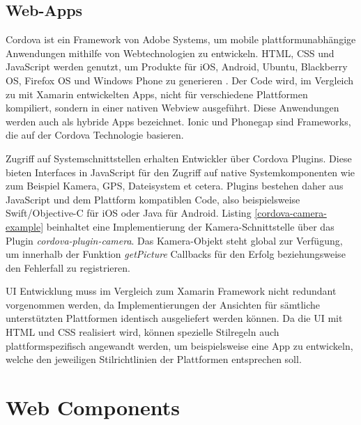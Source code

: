 \newpage


\subsection{Web-Apps}

Cordova ist ein Framework von Adobe Systems, um mobile plattformunabhängige Anwendungen mithilfe von Webtechnologien zu entwickeln.
\ac{HTML}, \ac{CSS} und JavaScript werden genutzt, um Produkte für iOS, Android, Ubuntu, Blackberry OS, Firefox OS und Windows Phone zu generieren \cite{Cordo26:online}.
Der Code wird, im Vergleich zu mit Xamarin entwickelten Apps, nicht für verschiedene Plattformen kompiliert,
sondern in einer nativen Webview ausgeführt. Diese Anwendungen werden auch als hybride Apps bezeichnet.
Ionic und Phonegap sind Frameworks, die auf der Cordova Technologie basieren.

Zugriff auf Systemschnittstellen erhalten Entwickler über Cordova Plugins. Diese bieten
Interfaces in JavaScript für den Zugriff auf native Systemkomponenten wie zum Beispiel Kamera, GPS, Dateisystem et cetera.
Plugins bestehen daher aus JavaScript und dem Plattform kompatiblen Code,
also beispielsweise Swift/Objective-C für iOS oder Java für Android.
Listing \ref{cordova-camera-example} beinhaltet eine Implementierung der Kamera-Schnittstelle über das Plugin \emph{cordova-plugin-camera}.
Das Kamera-Objekt steht global zur Verfügung, um innerhalb der Funktion \emph{getPicture} Callbacks für den Erfolg beziehungsweise den Fehlerfall zu registrieren.

\ac{UI} Entwicklung muss im Vergleich zum Xamarin Framework nicht redundant vorgenommen werden, da Implementierungen der
Ansichten für sämtliche unterstützten Plattformen identisch ausgeliefert werden können.
Da die \ac{UI} mit \ac{HTML} und \ac{CSS} realisiert wird,
können spezielle Stilregeln auch plattformspezifisch angewandt werden, um beispielsweise eine App zu entwickeln,
welche den jeweiligen Stilrichtlinien der Plattformen entsprechen soll.

\vspace{0.3cm}

\vspace{0.3cm}

\newpage
\section{Web Components}
\label{sec:webcomponents}


